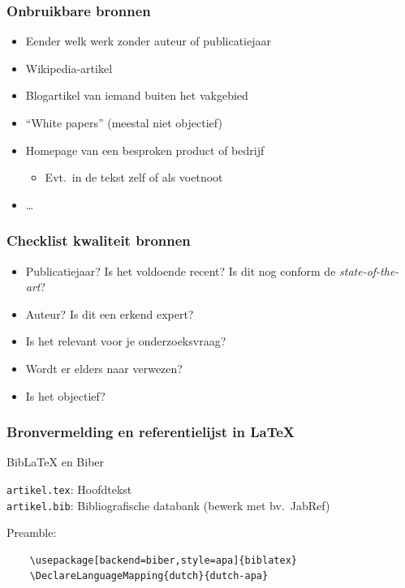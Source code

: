 \documentclass{beamer}
\begin{document}
\begin{frame}
  \frametitle{Onbruikbare bronnen}

  \begin{itemize}
    \item Eender welk werk zonder auteur of publicatiejaar
    \item Wikipedia-artikel
    \item Blogartikel van iemand buiten het vakgebied
    \item ``White papers'' (meestal niet objectief)
    \item Homepage van een besproken product of bedrijf
      \begin{itemize}
        \item Evt.~in de tekst zelf of als voetnoot
      \end{itemize}
    \item \dots
  \end{itemize}
\end{frame}

\begin{frame}
  \frametitle{Checklist kwaliteit bronnen}

  \begin{itemize}
    \item Publicatiejaar? Is het voldoende recent? Is dit nog conform de \emph{state-of-the-art}?
    \item Auteur? Is dit een erkend expert?
    \item Is het relevant voor je onderzoeksvraag?
    \item Wordt er elders naar verwezen?
    \item Is het objectief?
  \end{itemize}
\end{frame}

\begin{frame}[fragile]
  \frametitle{Bronvermelding en referentielijst in {\LaTeX}}
  
  Bib{\LaTeX} en Biber

  \vspace{18pt}

  \verb|artikel.tex|: Hoofdtekst\\
  \verb|artikel.bib|: Bibliografische databank (bewerk met bv.~JabRef)

  \vspace{18pt}
  
  Preamble:
  
  \begin{verbatim}
    \usepackage[backend=biber,style=apa]{biblatex}
    \DeclareLanguageMapping{dutch}{dutch-apa}
    
  \end{verbatim}

\end{frame}
\end{document}
